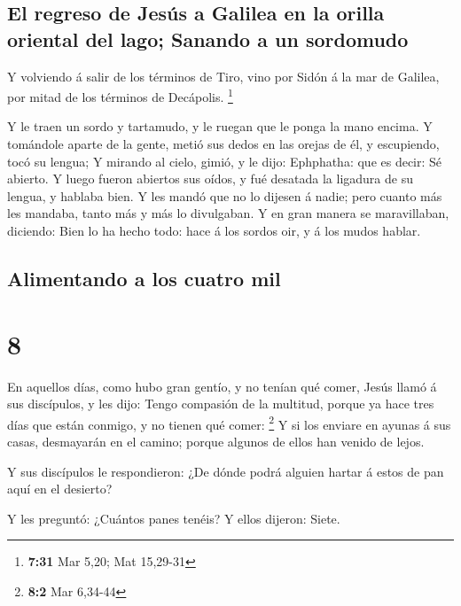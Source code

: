 \hypertarget{el-regreso-de-jesuxfas-a-galilea-en-la-orilla-oriental-del-lago-sanando-a-un-sordomudo}{%
\subsection{El regreso de Jesús a Galilea en la orilla oriental del
lago; Sanando a un
sordomudo}\label{el-regreso-de-jesuxfas-a-galilea-en-la-orilla-oriental-del-lago-sanando-a-un-sordomudo}}

 Y volviendo á salir de los términos de Tiro, vino por
Sidón á la mar de Galilea, por mitad de los términos de Decápolis.
\footnote{\textbf{7:31} Mar 5,20; Mat 15,29-31}

 Y le traen un sordo y tartamudo, y le ruegan que le ponga
la mano encima.  Y tomándole aparte de la gente, metió sus
dedos en las orejas de él, y escupiendo, tocó su lengua;  Y
mirando al cielo, gimió, y le dijo: Ephphatha: que es decir: Sé abierto.
 Y luego fueron abiertos sus oídos, y fué desatada la
ligadura de su lengua, y hablaba bien.  Y les mandó que no
lo dijesen á nadie; pero cuanto más les mandaba, tanto más y más lo
divulgaban.  Y en gran manera se maravillaban, diciendo:
Bien lo ha hecho todo: hace á los sordos oir, y á los mudos hablar.

\hypertarget{alimentando-a-los-cuatro-mil}{%
\subsection{Alimentando a los cuatro
mil}\label{alimentando-a-los-cuatro-mil}}

\hypertarget{section-7}{%
\section{8}\label{section-7}}

 En aquellos días, como hubo gran gentío, y no tenían qué
comer, Jesús llamó á sus discípulos, y les dijo:  Tengo
compasión de la multitud, porque ya hace tres días que están conmigo, y
no tienen qué comer: \footnote{\textbf{8:2} Mar 6,34-44}  Y
si los enviare en ayunas á sus casas, desmayarán en el camino; porque
algunos de ellos han venido de lejos.

 Y sus discípulos le respondieron: ¿De dónde podrá alguien
hartar á estos de pan aquí en el desierto?

 Y les preguntó: ¿Cuántos panes tenéis? Y ellos dijeron:
Siete.

